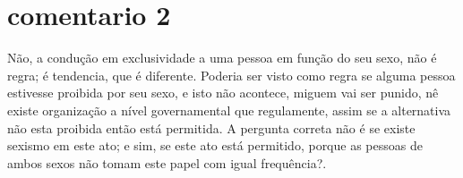 \documentclass[a4paper,10pt]{article}
\begin{document}
\section{comentario 2}

\begin{comment}
eu concordo que a idéia de uma pessoa conduzir outra na dança, apesar de autoritária, não necessariamente é machista, mas acontece que nesse planeta a condução ainda é, em regra, monopólio dos homens. Estou entendendo que você não vê machismo na estrutura da condução tradicional ("cavalheiro" conduz e "dama" responde), pois entende que homem conduzir não é uma regra mas uma "tendência" imitada dos bichos tentando acasalar, é isso? Se for isso eu tenho que discordar de você. A convenção de que o homem deve conduzir a mulher surgiu no período cavalheiresco em que se acreditava que o homem deveria tutelar a mulher pois teoricamente elas eram incapazes de decidirem o rumo de suas vidas de forma autônoma, e seguiu nessa lógica até hoje. É importante atentarmos para questões históricas para não cairmos em achismos. Agora, a nossa opinião não tem tanta relevância diante da opinião de milhares de mulheres da comunidade da dança de salão que estão há um bom tempo denunciando esse machismo. Acho que devemos respeitar essas mulheres e ouví-las, afinal, não somo animais irracionais cortejando, somos seres humanos conscientes. E se conduzir não é machista, desprezar a opinião das mulheres certamente é. Então vamos ouvir mais elas? Vai ser bom para abrir a cabeça, garanto. Abração.﻿
\end{comment}
Não, a condução em exclusividade a uma pessoa em função do seu sexo, não é regra; é tendencia, que é diferente. Poderia ser visto como regra se alguma pessoa estivesse proibida por seu sexo, e isto não acontece, miguem vai ser punido, nê existe organização a nível governamental que regulamente, assim se a alternativa não esta proibida então está permitida. A pergunta correta não é se existe sexismo em este ato; e sim, se este ato está permitido, porque as pessoas de ambos sexos não tomam este papel com igual frequência?. 
\end{document}
